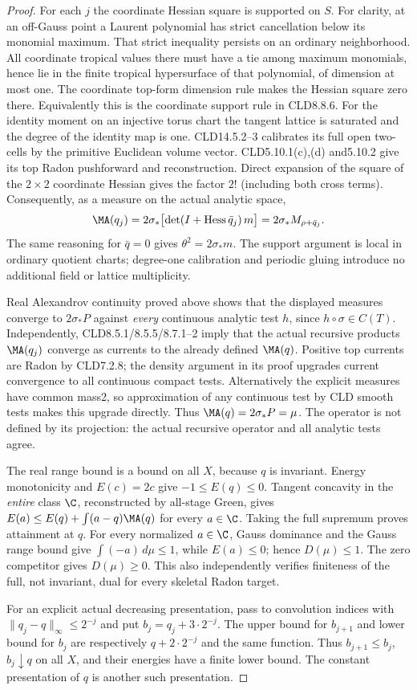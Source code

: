 \begin{proof}
For each $j$ the coordinate Hessian square is supported on $S$.
For clarity, at an off-Gauss point a Laurent polynomial has strict
cancellation below its monomial maximum. That strict inequality
persists on an ordinary neighborhood. All coordinate tropical values
there must have a tie among maximum monomials, hence lie in the finite
tropical hypersurface of that polynomial, of dimension at most one.
The coordinate top-form dimension rule makes the Hessian square zero
there. Equivalently this is the coordinate support rule in CLD8.8.6.
For the identity moment on an injective torus chart the tangent lattice
is saturated and the degree of the identity map is one. CLD14.5.2--3
calibrates its full open two-cells by the primitive Euclidean volume
vector. CLD5.10.1(c),(d) and5.10.2 give its top Radon pushforward and
reconstruction. Direct expansion of the square of the $2\times2$
coordinate Hessian gives the factor $2!$ (including both cross terms).
Consequently, as a measure on the actual analytic space,
\[
 \MA(q_j)=2\sigma_*\bigl[\det(I+\operatorname{Hess}\bar q_j)\,m\bigr]
 =2\sigma_*M_{\rho+\bar q_j}.
\]
The same reasoning for $\bar q=0$ gives $\theta^2=2\sigma_*m$.
The support argument is local in ordinary quotient charts; degree-one
calibration and periodic gluing introduce no additional field or
lattice multiplicity.

Real Alexandrov continuity proved above shows that the displayed
measures converge to $2\sigma_*P$ against \emph{every} continuous
analytic test $h$, since $h\circ\sigma\in C(T)$. Independently,
CLD8.5.1/8.5.5/8.7.1--2 imply that the actual recursive products
$\MA(q_j)$ converge as currents to the already defined $\MA(q)$.
Positive top currents are Radon by CLD7.2.8; the density argument in
its proof upgrades current convergence to all continuous compact tests.
Alternatively the explicit measures have common mass2, so approximation
of any continuous test by CLD smooth tests makes this upgrade directly.
Thus $\MA(q)=2\sigma_*P=\mu$. The operator is not defined by its
projection: the actual recursive operator and all analytic tests agree.

The real range bound is a bound on all $X$, because $q$ is invariant.
Energy monotonicity and $E(c)=2c$ give $-1\le E(q)\le0$.
Tangent concavity in the \emph{entire} class $\C$, reconstructed
by all-stage Green, gives
$E(a)\le E(q)+\int(a-q)\MA(q)$ for every $a\in\C$.
Taking the full supremum proves attainment at $q$.
For every normalized $a\in\C$, Gauss dominance and the Gauss range
bound give $\int(-a)\,d\mu\le1$, while $E(a)\le0$; hence
$D(\mu)\le1$. The zero competitor gives $D(\mu)\ge0$.
This also independently verifies finiteness of the full, not invariant,
dual for every skeletal Radon target.

For an explicit actual decreasing presentation, pass to convolution
indices with $\|q_j-q\|_\infty\le2^{-j}$ and put
$b_j=q_j+3\cdot2^{-j}$. The upper bound for $b_{j+1}$ and lower
bound for $b_j$ are respectively $q+2\cdot2^{-j}$ and the same
function. Thus $b_{j+1}\le b_j$, $b_j\downarrow q$ on all $X$,
and their energies have a finite lower bound. The constant presentation
of $q$ is another such presentation.
\end{proof}

